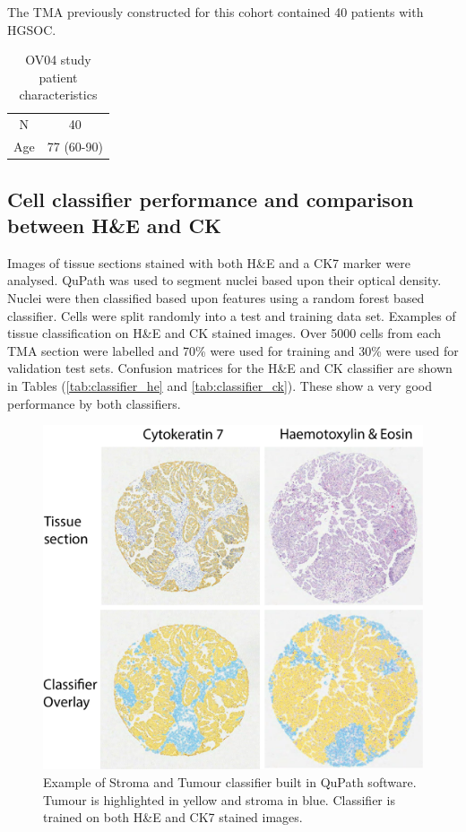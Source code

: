 The TMA previously constructed for this cohort contained 40 patients with HGSOC. 

\begin{table}[]
    \centering
    \begin{tabular}{c|c}
       N  &  40 \\
        Age &  77 (60-90)
    \end{tabular}
    \caption{OV04 study patient characteristics}
    \label{tab:OV04_patient}
\end{table}




\subsection{Cell classifier performance and comparison between H\&E and CK}

Images of tissue sections stained with both H\&E and a CK7 marker were analysed. QuPath was used to segment nuclei based upon their optical density. Nuclei were then classified based upon features using a random forest based classifier. Cells were split randomly into a test and training data set. Examples of tissue classification on H\&E and CK stained images. Over 5000 cells from each TMA section were labelled and 70\% were used for training and 30\% were used for validation test sets. Confusion matrices for the H\&E and CK classifier are shown in Tables (\ref{tab:classifier_he} and \ref{tab:classifier_ck}). These show a very good performance by both classifiers. 


\begin{figure}
    \centering
    \includegraphics{Figs/heck/A-2_core_class.png}
    \caption[Example of Stroma and Tumour classifier built in QuPath software]{Example of Stroma and Tumour classifier built in QuPath software. Tumour is highlighted in yellow and stroma in blue. Classifier is trained on both H\&E and CK7 stained images.}
    \label{fig:he_classify}
\end{figure}

